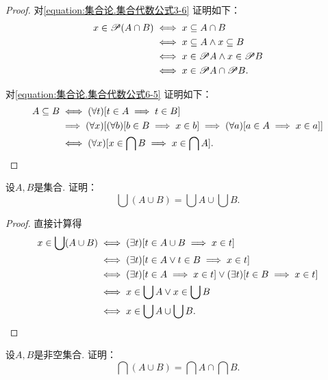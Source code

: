 \begin{property}
\begin{proof}
对\cref{equation:集合论.集合代数公式3-6} 证明如下：
\begin{align*}
	x \in \mathscr{P} (A \cap B)
	&\iff x \subseteq A \cap B \\
	&\iff x \subseteq A \land x \subseteq B \\
	&\iff x \in \mathscr{P} A \land x \in \mathscr{P} B \\
	&\iff x \in \mathscr{P} A \cap \mathscr{P} B.
\end{align*}

对\cref{equation:集合论.集合代数公式6-5} 证明如下：
\begin{align*}
	A \subseteq B
	&\iff (\forall t)[t \in A \implies t \in B] \\
	&\implies (\forall x)[
		(\forall b)[b \in B \implies x \in b]
		\implies
		(\forall a)[a \in A \implies x \in a]
	] \\
	&\iff (\forall x)[x \in \bigcap B \implies x \in \bigcap A].
	\qedhere
\end{align*}
\end{proof}
\end{property}

\begin{example}
设\(A,B\)是集合.
证明：\begin{equation}\label{equation:集合论.并集的并等于并的并集}
	\bigcup(A \cup B) = \bigcup A \cup \bigcup B.
\end{equation}
\begin{proof}
直接计算得
\begin{align*}
	x \in \bigcup(A \cup B)
	&\iff
	(\exists t)[t \in A \cup B \implies x \in t] \\
	&\iff
	(\exists t)[t \in A \lor t \in B \implies x \in t] \\
	&\iff
	(\exists t)[t \in A \implies x \in t] \lor (\exists t)[t \in B \implies x \in t] \\
	&\iff
	x \in \bigcup A \lor x \in \bigcup B \\
	&\iff
	x \in \bigcup A \cup \bigcup B.
	\qedhere
\end{align*}
\end{proof}
\end{example}

\begin{example}
设\(A,B\)是非空集合.
证明：\begin{equation}
	\bigcap(A \cup B) = \bigcap A \cap \bigcap B.
\end{equation}
\end{example}

